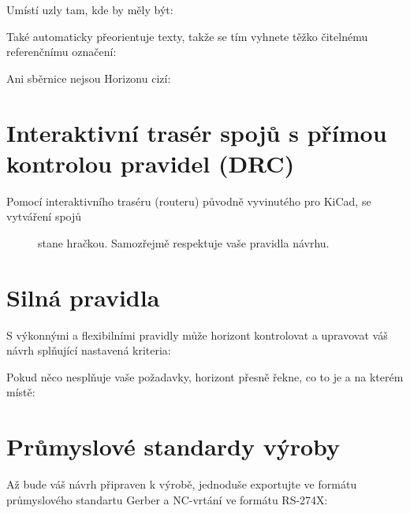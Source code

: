\documentclass[letterpaper,10pt,czech]{sphinxmanual}
\begin{document}
\noindent{}

Umístí uzly tam, kde by měly být:

\noindent{}

Také automaticky přeorientuje texty, takže se tím vyhnete
těžko čitelnému referenčnímu označení:

\noindent{}

Ani sběrnice nejsou Horizonu cizí:

\noindent{}


\section{Interaktivní trasér spojů s přímou kontrolou pravidel (DRC)}
\label{\detokenize{feature-overview_cz:interaktivni-traser-spoju-s-primou-kontrolou-pravidel-drc}}\begin{description}
\item[{Pomocí interaktivního traséru (routeru) původně vyvinutého pro KiCad, se vytváření spojů}] \leavevmode
stane hračkou. Samozřejmě respektuje vaše pravidla návrhu.

\end{description}

\noindent{}


\section{Silná pravidla}
\label{\detokenize{feature-overview_cz:silna-pravidla}}
S výkonnými a flexibilními pravidly může horizont kontrolovat a upravovat váš
návrh splňující nastavená kriteria:

\noindent{}

Pokud něco nesplňuje vaše požadavky, horizont přesně řekne, co to je a
na kterém místě:

\noindent{}


\section{Průmyslové standardy výroby}
\label{\detokenize{feature-overview_cz:prumyslove-standardy-vyroby}}
Až bude váš návrh připraven k výrobě, jednoduše exportujte ve formátu
průmyslového standartu Gerber a NC-vrtání ve formátu RS-274X:
\end{document}
